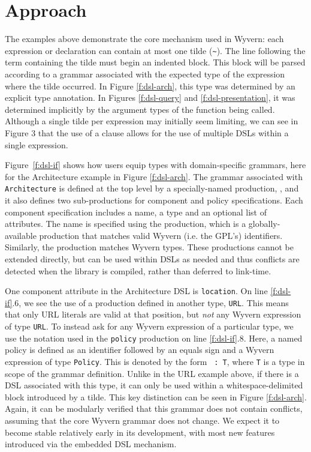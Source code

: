 \section{Approach}
\label{s:approach}
The examples above demonstrate the core mechanism used in Wyvern: each expression or declaration can contain at most one tilde (\verb|~|). The line following the term containing the tilde must begin an indented block. This block will be parsed according to a grammar associated with the expected type of the expression where the tilde occurred. In Figure \ref{f:dsl-arch}, this type was determined by an explicit type annotation. In Figures \ref{f:dsl-query} and \ref{f:dsl-presentation}, it was determined implicitly by the argument types of the function being called. Although a single tilde per expression may initially seem limiting, we can see in Figure 3 that the use of a  clause allows for the use of multiple DSLs within a single expression.

Figure~\ref{f:dsl-if} shows how users equip types with domain-specific grammars, here for the Architecture example in Figure \ref{f:dsl-arch}. The grammar associated with \lstinline{Architecture} is defined at the top level by a specially-named production, , and it also defines two sub-productions for component and policy specifications. Each component specification includes a name, a type and an optional list of attributes. The name is specified using the  production, which is a globally-available production that matches valid Wyvern (i.e. the GPL's) identifiers. Similarly, the  production matches Wyvern types. These productions cannot be extended directly, but can be used within DSLs as needed and thus conflicts are detected when the library is compiled, rather than deferred to link-time. 

One component attribute in the Architecture DSL is \lstinline{location}. On line \ref{f:dsl-if}.6, we see the use of a production defined in another type, \verb|URL|. This means that only URL literals are valid at that position, but \emph{not} any Wyvern expression of type \verb|URL|. To instead ask for any Wyvern expression of a particular type, we use the notation used in the \lstinline{policy} production on line \ref{f:dsl-if}.8. Here, a named policy is defined as an identifier followed by an equals sign and a Wyvern expression of type \lstinline{Policy}. This is denoted by the form \verb| : T|, where \verb|T| is a type in scope of the grammar definition. Unlike in the URL example above, if there is a DSL associated with this type, it can only be used within a whitespace-delimited block introduced by a tilde. This key distinction can be seen in Figure \ref{f:dsl-arch}. Again, it can be modularly verified that this grammar does not contain conflicts, assuming that the core Wyvern grammar does not change. We expect it to become stable relatively early in its development, with most new features introduced via the embedded DSL mechanism.

